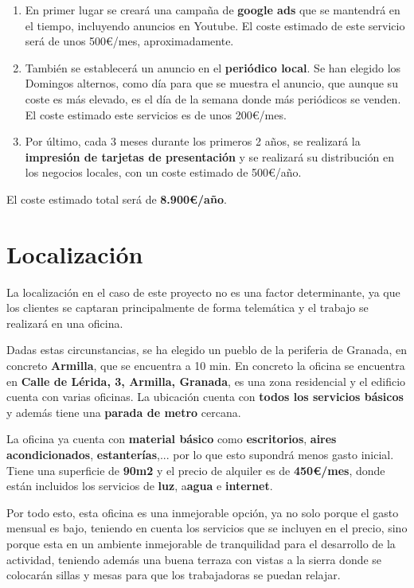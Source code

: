 \begin{enumerate}
    \item En primer lugar se creará una campaña de \textbf{google ads} que se mantendrá en el tiempo, incluyendo anuncios en Youtube. El coste estimado de este servicio será de unos 500€/mes, aproximadamente.
    \item También se establecerá un anuncio en el \textbf{periódico local}. Se han elegido los Domingos alternos, como día para que se muestra el anuncio, que aunque su coste es más elevado, es el día de la semana donde más periódicos se venden. El coste estimado este servicios es de unos 200€/mes.
    \item Por último, cada 3 meses durante los primeros 2 años, se realizará la \textbf{impresión de tarjetas de presentación} y se realizará su distribución en los negocios locales, con un coste estimado de 500€/año.
\end{enumerate}

El coste estimado total será de \textbf{ 8.900€/año}.

\section{Localización}
La localización en el caso de este proyecto no es una factor determinante, ya que los clientes se captaran principalmente de forma telemática y el trabajo se realizará en una oficina.

Dadas estas circunstancias, se ha elegido un pueblo de la periferia de Granada, en concreto \textbf{Armilla}, que se encuentra a 10 min. En concreto la oficina se encuentra en  \textbf{Calle de Lérida, 3, Armilla, Granada}, es una zona residencial y el edificio cuenta con varias oficinas. La ubicación cuenta con \textbf{todos los servicios básicos} y además tiene una \textbf{parada de metro} cercana.

La oficina ya cuenta con \textbf{material básico} como \textbf{escritorios}, \textbf{aires acondicionados}, \textbf{estanterías},... por lo que esto supondrá menos gasto inicial. Tiene una superficie de \textbf{90m2} y el precio de alquiler es de \textbf{450€/mes}, donde están incluidos los servicios de \textbf{luz}, a\textbf{agua} e \textbf{internet}.

Por todo esto, esta oficina es una inmejorable opción, ya no solo porque el gasto mensual es bajo, teniendo en cuenta los servicios que se incluyen en el precio, sino porque esta en un ambiente inmejorable de tranquilidad para el desarrollo de la actividad, teniendo además una buena terraza con vistas a la sierra donde se colocarán sillas y mesas para que los trabajadoras se puedan relajar.

